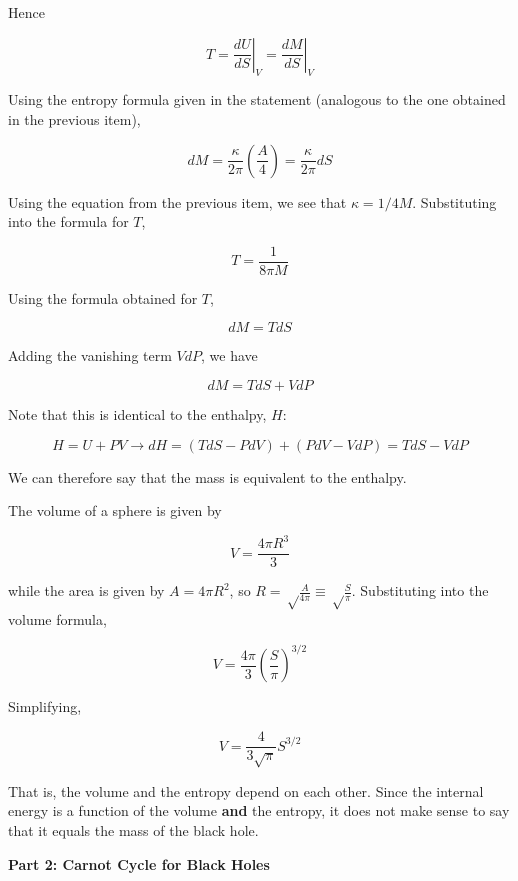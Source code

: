 \documentclass[11pt]{article}
\begin{document}
\begin{pproblem}
\begin{pssolution*}{}{}
\begin{alternativas}
            Hence

            \[T = \left.\frac{dU}{dS}\right\vert_V = \left.\frac{dM}{dS}\right\vert_V\]

            Using the entropy formula given in the statement (analogous to the one obtained in the previous item),

            \[dM = \frac{\kappa}{2\pi}\left(\frac{A}{4}\right) = \frac{\kappa}{2\pi}dS\]

            Using the equation from the previous item, we see that \(\kappa = 1/4M\). Substituting into the formula for \(T\),

            \[\boxed{T = \frac{1}{8\pi M}}\]

            \item Using the formula obtained for \(T\),
            
            \[dM = TdS\]

            Adding the vanishing term \(VdP\), we have

            \[dM = TdS + VdP\]

            Note that this is identical to the enthalpy, \(H\):

            \[H = U + PV \rightarrow dH = (TdS - PdV) +  (PdV - VdP) = TdS - VdP\]

            We can therefore say that the mass is equivalent to the enthalpy.

            \item The volume of a sphere is given by
            
            \[V = \frac{4\pi R^3}{3}\]

            while the area is given by \(A = 4\pi R^2\), so \(R = \sqrt\frac{A}{4\pi}\equiv \sqrt\frac{S}{\pi}\). Substituting into the volume formula,
            
            \[V = \frac{4\pi}{3}\left(\frac{S}{\pi}\right)^{3/2}\]

            Simplifying,

            \[\boxed{V = \frac{4}{3\sqrt{\pi}}S^{3/2}}\]

            That is, the volume and the entropy depend on each other. Since the internal energy is a function of the volume \textbf{and} the entropy, it does not make sense to say that it equals the mass of the black hole.
        \end{alternativas}
    
        \begin{center}
            \textbf{Part 2: Carnot Cycle for Black Holes}
        \end{center}


\end{pssolution*}
\end{pproblem}
\end{document}
